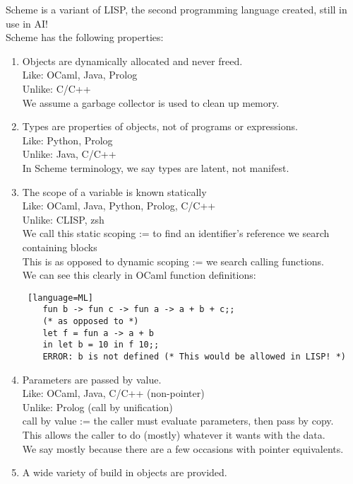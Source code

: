\documentclass[../../lecture_notes.tex]{subfiles}
\begin{document}
\noindent Scheme is a variant of LISP, the second programming language created, still in use in AI!\\
Scheme has the following properties:
\begin{enumerate}
	\item Objects are dynamically allocated and never freed.\\
		Like: OCaml, Java, Prolog\\
		Unlike: C/C++\\
		We assume a garbage collector is used to clean up memory.
	\item Types are properties of objects, not of programs or expressions.\\
 		Like: Python, Prolog\\
 		Unlike: Java, C/C++\\
		In Scheme terminology, we say types are latent, not manifest.\\
	\item The scope of a variable is known statically\\
		Like: OCaml, Java, Python, Prolog, C/C++\\
		Unlike: CLISP, zsh\\
		We call this static scoping := to find an identifier’s reference we search containing blocks\\
		This is as opposed to dynamic scoping := we search calling functions.\\
		We can see this clearly in OCaml function definitions:\\
		\begin{lstlisting} [language=ML]
	fun b -> fun c -> fun a -> a + b + c;;
	(* as opposed to *)
	let f = fun a -> a + b
	in let b = 10 in f 10;; 
	ERROR: b is not defined (* This would be allowed in LISP! *)
		\end{lstlisting}
	\item Parameters are passed by value.\\
		Like: OCaml, Java, C/C++ (non-pointer)\\
		Unlike: Prolog (call by unification)\\
		call by value := the caller must evaluate parameters, then pass by copy.\\
		This allows the caller to do (mostly) whatever it wants with the data.\\
		We say mostly because there are a few occasions with pointer equivalents.
	\item A wide variety of build in objects are provided.\\

\end{enumerate}
\end{document}
